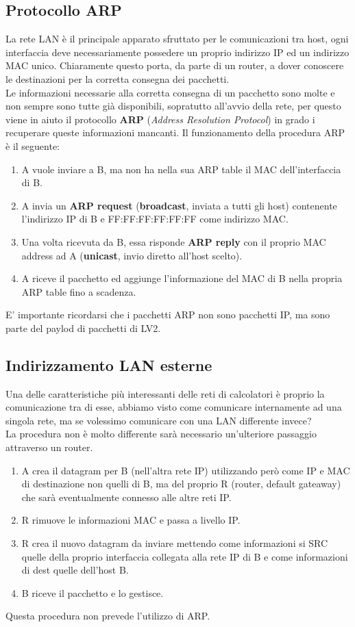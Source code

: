 \documentclass[12pt]{article}
\begin{document}
\subsection{Protocollo ARP} %
La rete LAN è il principale apparato sfruttato per le comunicazioni tra host, ogni interfaccia deve necessariamente possedere un proprio indirizzo IP ed un indirizzo MAC unico. Chiaramente questo porta, da parte di un router, a dover conoscere le destinazioni per la corretta consegna dei pacchetti.\\
Le informazioni necessarie alla corretta consegna di un pacchetto sono molte e non sempre sono tutte già disponibili, sopratutto all'avvio della rete, per questo viene in aiuto il protocollo \textbf{ARP} (\textit{Address Resolution Protocol}) in grado i recuperare queste informazioni mancanti. Il funzionamento della procedura ARP è il seguente:
\begin{enumerate}
  \item A vuole inviare a B, ma non ha nella sua ARP table il MAC dell'interfaccia di B.
  \item A invia un \textbf{ARP request} (\textbf{broadcast}, inviata a tutti gli host) contenente l'indirizzo IP di B e FF:FF:FF:FF:FF:FF come indirizzo MAC.
  \item Una volta ricevuta da B, essa risponde \textbf{ARP reply} con il proprio MAC address ad A (\textbf{unicast}, invio diretto all'host scelto).
  \item A riceve il pacchetto ed aggiunge l'informazione del MAC di B nella propria ARP table fino a scadenza.
\end{enumerate}
E' importante ricordarsi che i pacchetti ARP non sono pacchetti IP, ma sono parte del paylod di pacchetti di LV2.

\subsection{Indirizzamento LAN esterne} %
Una delle caratteristiche più interessanti delle reti di calcolatori è proprio la comunicazione tra di esse, abbiamo visto come comunicare internamente ad una singola rete, ma se volessimo comunicare con una LAN differente invece?\\
La procedura non è molto differente sarà necessario un'ulteriore passaggio attraverso un router.
\begin{enumerate}
  \item A crea il datagram per B (nell'altra rete IP) utilizzando però come IP e MAC di destinazione non quelli di B, ma del proprio R (router, default gateaway) che sarà eventualmente connesso alle altre reti IP.
  \item R rimuove le informazioni MAC e passa a livello IP.
  \item R crea il nuovo datagram da inviare mettendo come informazioni si SRC quelle della proprio interfaccia collegata alla rete IP di B e come informazioni di dest quelle dell'host B.
  \item B riceve il pacchetto e lo gestisce.
\end{enumerate}
Questa procedura non prevede l'utilizzo di ARP.
\end{document}

